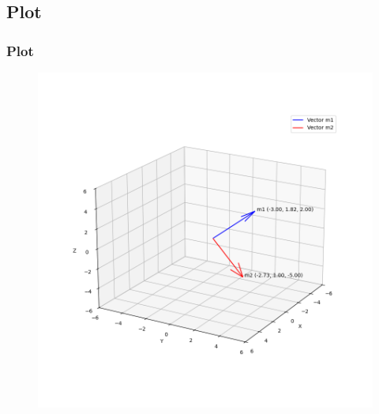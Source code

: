 \documentclass{beamer}
\theoremstyle{remark}
\numberwithin{equation}{section}
\begin{document}
\subsection{Plot}
\begin{frame}[fragile]
\frametitle{Plot}

\begin{figure}[h!]
   \centering
   \includegraphics[width=0.8\linewidth]{figs/fig1.png}
	\caption{}
   \label{stemplot}
\end{figure}
\end{frame}
\end{document}
